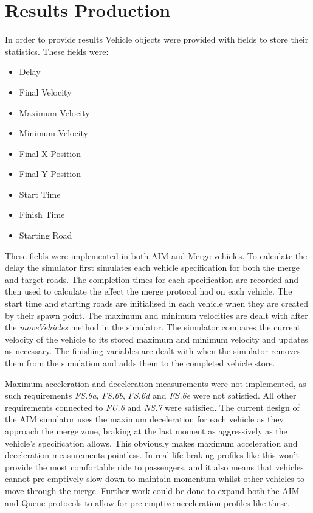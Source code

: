 \section{Results Production}
\label{sec:Results Production}
In order to provide results Vehicle objects were provided with fields to store their statistics. These fields were:

\begin{itemize}
\item Delay
\item Final Velocity
\item Maximum Velocity
\item Minimum Velocity
\item Final X Position
\item Final Y Position
\item Start Time
\item Finish Time
\item Starting Road
\end{itemize}

These fields were implemented in both AIM and Merge vehicles. To calculate the delay the simulator first simulates each vehicle specification for both the merge and target roads. The completion times for each specification are recorded and then used to calculate the effect the merge protocol had on each vehicle. The start time and starting roads are initialised in each vehicle when they are created by their spawn point. The maximum and minimum velocities are dealt with after the \emph{moveVehicles} method in the simulator. The simulator compares the current velocity of the vehicle to its stored maximum and minimum velocity and updates as necessary. The finishing variables are dealt with when the simulator removes them from the simulation and adds them to the completed vehicle store. 

Maximum acceleration and deceleration measurements were not implemented, as such requirements \emph{FS.6a}, \emph{FS.6b}, \emph{FS.6d} and \emph{FS.6e} were not satisfied. All other requirements connected to \emph{FU.6} and \emph{NS.7} were satisfied. The current design of the AIM simulator uses the maximum deceleration for each vehicle as they approach the merge zone, braking at the last moment as aggressively as the vehicle's specification allows. This obviously makes maximum acceleration and deceleration measurements pointless. In real life braking profiles like this won't provide the most comfortable ride to passengers, and it also means that vehicles cannot pre-emptively slow down to maintain momentum whilst other vehicles to move through the merge. Further work could be done to expand both the AIM and Queue protocols to allow for pre-emptive acceleration profiles like these.

